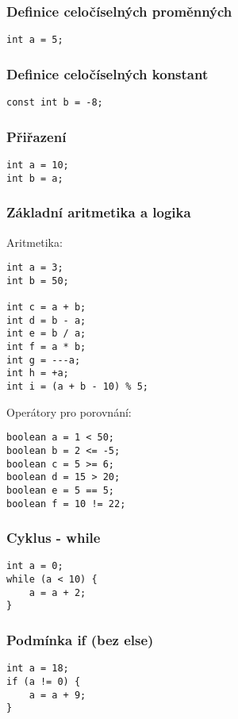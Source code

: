 \documentclass[czech, oth, kiv, he, iso690numb, viewonly]{fasthesis}
\begin{document}
\subsubsection{Definice celočíselných proměnných}
\begin{lstlisting}[]
int a = 5;
\end{lstlisting}


\subsubsection{Definice celočíselných konstant}
\begin{lstlisting}[]
const int b = -8;
\end{lstlisting}

\subsubsection{Přiřazení}
\begin{lstlisting}[]
int a = 10;
int b = a;
\end{lstlisting}

\subsubsection{Základní aritmetika a logika}
Aritmetika:
\begin{lstlisting}[]
int a = 3;
int b = 50;

int c = a + b;
int d = b - a;
int e = b / a;
int f = a * b;
int g = ---a; 
int h = +a;   
int i = (a + b - 10) % 5; 
\end{lstlisting}
Operátory pro porovnání:
\begin{lstlisting}[]
boolean a = 1 < 50;
boolean b = 2 <= -5;
boolean c = 5 >= 6;
boolean d = 15 > 20;
boolean e = 5 == 5;
boolean f = 10 != 22;
\end{lstlisting}

\subsubsection{Cyklus - while}
\begin{lstlisting}[]
int a = 0;
while (a < 10) {
    a = a + 2;
}
\end{lstlisting}

\subsubsection{Podmínka if (bez else)}
\begin{lstlisting}[]
int a = 18;
if (a != 0) {
    a = a + 9;
}
\end{lstlisting}
\end{document}
